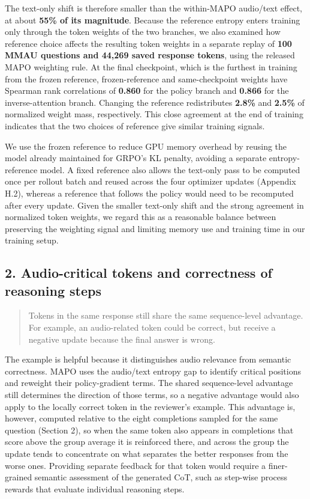 The text-only shift is therefore smaller than the within-MAPO audio/text effect, at about \textbf{55\% of its magnitude}. Because the reference entropy enters training only through the token weights of the two branches, we also examined how reference choice affects the resulting token weights in a separate replay of \textbf{100 MMAU questions and 44,269 saved response tokens}, using the released MAPO weighting rule. At the final checkpoint, which is the furthest in training from the frozen reference, frozen-reference and same-checkpoint weights have Spearman rank correlations of \textbf{0.860} for the policy branch and \textbf{0.866} for the inverse-attention branch. Changing the reference redistributes \textbf{2.8\%} and \textbf{2.5\%} of normalized weight mass, respectively. This close agreement at the end of training indicates that the two choices of reference give similar training signals.

We use the frozen reference to reduce GPU memory overhead by reusing the model already maintained for GRPO's KL penalty, avoiding a separate entropy-reference model. A fixed reference also allows the text-only pass to be computed once per rollout batch and reused across the four optimizer updates (Appendix H.2), whereas a reference that follows the policy would need to be recomputed after every update. Given the smaller text-only shift and the strong agreement in normalized token weights, we regard this as a reasonable balance between preserving the weighting signal and limiting memory use and training time in our training setup.

\subsection*{2. Audio-critical tokens and correctness of reasoning steps}

\begin{quote}\small\color{ReviewQuote}
Tokens in the same response still share the same sequence-level advantage. For example, an audio-related token could be correct, but receive a negative update because the final answer is wrong.

\end{quote}

The example is helpful because it distinguishes audio relevance from semantic correctness. MAPO uses the audio/text entropy gap to identify critical positions and reweight their policy-gradient terms. The shared sequence-level advantage still determines the direction of those terms, so a negative advantage would also apply to the locally correct token in the reviewer's example. This advantage is, however, computed relative to the eight completions sampled for the same question (Section 2), so when the same token also appears in completions that score above the group average it is reinforced there, and across the group the update tends to concentrate on what separates the better responses from the worse ones. Providing separate feedback for that token would require a finer-grained semantic assessment of the generated CoT, such as step-wise process rewards that evaluate individual reasoning steps.

